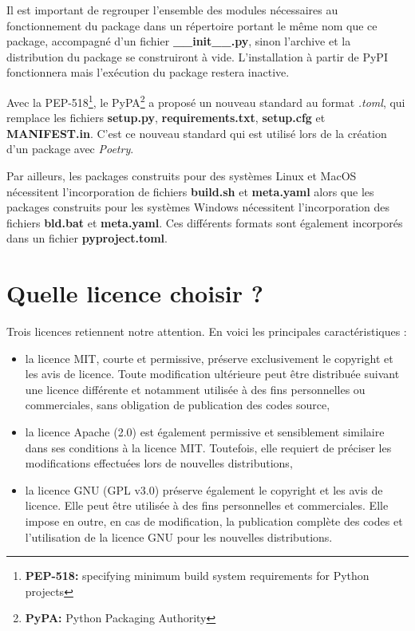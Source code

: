 \documentclass[twoside,a4paper,11pt,frenchb,openany]{report}
\begin{document}
Il est important de regrouper l'ensemble des modules nécessaires au fonctionnement du package dans un répertoire portant le même nom que ce package, accompagné d'un fichier \textbf{\_\_init\_\_.py}, sinon l'archive et la distribution du package se construiront à vide. L'installation à partir de PyPI fonctionnera mais l'exécution du package restera inactive.

Avec la PEP-518\footnote{\textbf{PEP-518:} specifying minimum build system requirements for Python projects}, le PyPA\footnote{\textbf{PyPA:} Python Packaging Authority} a proposé un nouveau standard au format \textit{.toml}, qui remplace les fichiers \textbf{setup.py}, \textbf{requirements.txt}, \textbf{setup.cfg} et \textbf{MANIFEST.in}. C'est ce nouveau standard qui est utilisé lors de la création d'un package avec \textit{Poetry}.

 Par ailleurs, les packages construits pour des systèmes Linux et MacOS nécessitent l'incorporation de fichiers \textbf{build.sh} et \textbf{meta.yaml} alors que les packages construits pour les systèmes Windows nécessitent l'incorporation des fichiers \textbf{bld.bat} et \textbf{meta.yaml}. Ces différents formats sont également incorporés dans un fichier \textbf{pyproject.toml}.



\section{Quelle licence choisir ?}
	
Trois licences retiennent notre attention. En voici les principales caractéristiques :
\begin{itemize}
\item	la licence MIT, courte et permissive, préserve exclusivement le copyright et les avis de licence. Toute modification ultérieure peut être distribuée suivant une licence différente et notamment utilisée à des fins personnelles ou commerciales, sans obligation de publication des codes source,
\item	la licence Apache (2.0) est également permissive et sensiblement similaire dans ses conditions à la licence MIT. Toutefois, elle requiert de préciser les modifications effectuées lors de nouvelles distributions,
\item	la licence GNU (GPL v3.0) préserve également le copyright et les avis de licence. Elle peut être utilisée à des fins personnelles et commerciales. Elle impose en outre, en cas de modification, la publication complète des codes et l'utilisation de la licence GNU pour les nouvelles distributions.
\end{itemize}
\end{document}
